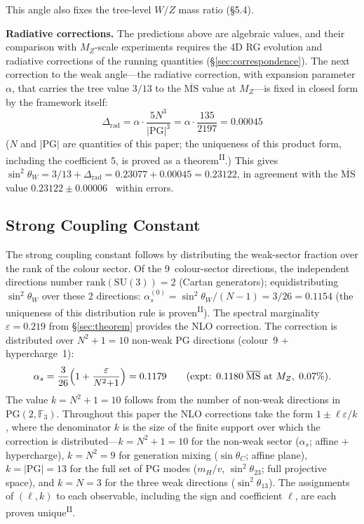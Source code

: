 \documentclass[12pt,a4paper]{article}
\newcommand{\PII}{\textsuperscript{\textup{II}}}
\begin{document}
This angle also fixes the tree-level $W/Z$ mass ratio (\S5.4).

\noindent\textbf{Radiative corrections.}\;
The predictions above are algebraic values, and their comparison with $M_Z$-scale experiments requires the 4D RG evolution and radiative corrections of the running quantities (\S\ref{sec:correspondence}).
The next correction to the weak angle---the radiative correction, with expansion parameter $\alpha$, that carries the tree value $3/13$ to the $\overline{\mathrm{MS}}$ value at $M_Z$---is fixed in closed form by the framework itself:
\[\Delta_\mathrm{rad} = \alpha\cdot\frac{5N^3}{|\mathrm{PG}|^3} = \alpha\cdot\frac{135}{2197} = 0.00045\]
($N$ and $|\mathrm{PG}|$ are quantities of this paper; the uniqueness of this product form, including the coefficient 5, is proved as a theorem\PII{}.) This gives $\sin^2\!\theta_W = 3/13 + \Delta_\mathrm{rad} = 0.23077 + 0.00045 = 0.23122$, in agreement with the $\overline{\mathrm{MS}}$ value $0.23122 \pm 0.00006$~\cite{pdg} within errors.

\subsection{Strong Coupling Constant}\label{sec:strong}

The strong coupling constant follows by distributing the weak-sector
fraction over the rank of the colour sector.
Of the 9~colour-sector directions, the independent directions
number $\mathrm{rank}(\mathrm{SU}(3)) = 2$ (Cartan generators);
equidistributing $\sin^2\!\theta_W$ over
these 2 directions:
$\alpha_s^{(0)} = \sin^2\!\theta_W/(N{-}1) = 3/26 = 0.1154$ (the uniqueness of this distribution rule is proven\PII{}).
The spectral marginality $\varepsilon = 0.219$ from \S\ref{sec:theorem}
provides the NLO correction.
The correction is distributed over $N^2{+}1 = 10$ non-weak
PG directions (colour~9 + hypercharge~1):
\begin{equation}\label{eq:alphas}
  \alpha_s = \frac{3}{26}\Bigl(1 + \frac{\varepsilon}{N^2{+}1}\Bigr) = 0.1179
  \qquad (\text{expt: } 0.1180\;\overline{\mathrm{MS}}\text{ at }M_Z,\; 0.07\%).
\end{equation}
The value $k = N^2{+}1 = 10$ follows from the number of non-weak directions in $\mathrm{PG}(2, \mathbb{F}_3)$. Throughout this paper the NLO corrections take the form
$1 \pm \ell\varepsilon/k$, where the denominator $k$ is the size of the
finite support over which the correction is distributed---$k = N^2{+}1 = 10$
for the non-weak sector ($\alpha_s$; affine $+$ hypercharge),
$k = N^2 = 9$ for generation mixing ($\sin\theta_C$; affine plane),
$k = |\mathrm{PG}| = 13$ for the full set of PG modes ($m_H/v$,
$\sin^2\!\theta_{23}$; full projective space), and $k = N = 3$ for the
three weak directions ($\sin^2\!\theta_{13}$). The assignments of
$(\ell, k)$ to each observable, including the sign and coefficient
$\ell$, are each proven unique\PII{}.
\end{document}
